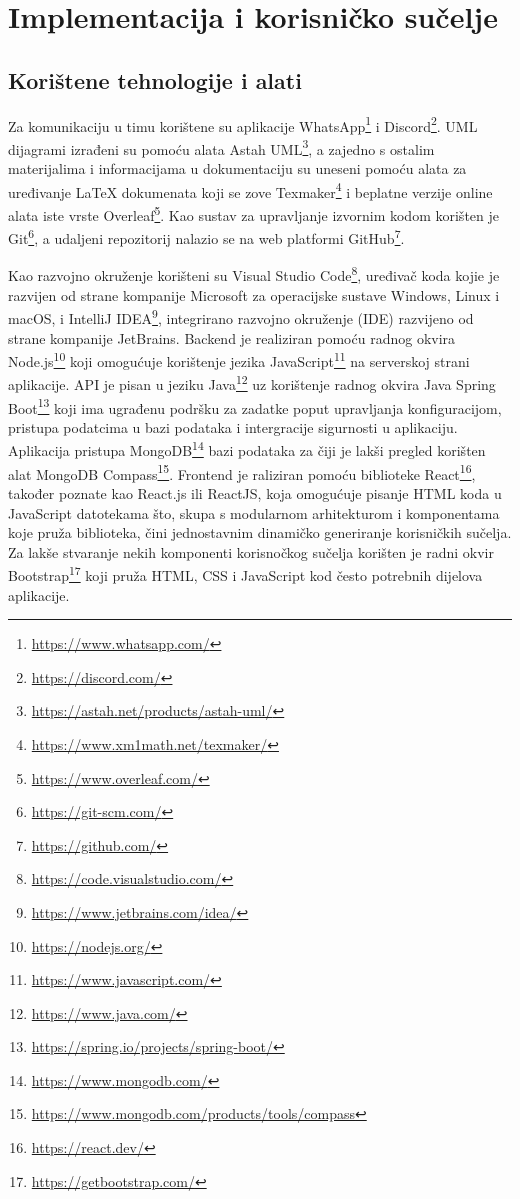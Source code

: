\chapter{Implementacija i korisničko sučelje}
		
		
		\section{Korištene tehnologije i alati}
		
			Za komunikaciju u timu korištene su aplikacije WhatsApp\footnote{\url{https://www.whatsapp.com/}} i Discord\footnote{\url{https://discord.com/}}. UML dijagrami izrađeni su pomoću alata Astah UML\footnote{\url{https://astah.net/products/astah-uml/}}, a zajedno s ostalim materijalima i informacijama u dokumentaciju su uneseni pomoću alata za uređivanje LaTeX dokumenata koji se zove Texmaker\footnote{\url{https://www.xm1math.net/texmaker/}} i beplatne verzije online alata iste vrste Overleaf\footnote{\url{https://www.overleaf.com/}}. Kao sustav za upravljanje izvornim kodom korišten je Git\footnote{\url{https://git-scm.com/}}, a udaljeni repozitorij nalazio se na web platformi GitHub\footnote{\url{https://github.com/}}. 

Kao razvojno okruženje korišteni su Visual Studio Code\footnote{\url{https://code.visualstudio.com/}}, uređivač koda kojie je razvijen od strane kompanije Microsoft za operacijske sustave Windows, Linux i macOS, i IntelliJ IDEA\footnote{\url{https://www.jetbrains.com/idea/}}, integrirano razvojno okruženje (IDE) razvijeno od strane kompanije JetBrains. Backend je realiziran pomoću radnog okvira Node.js\footnote{\url{https://nodejs.org/}} koji omogućuje korištenje jezika JavaScript\footnote{\url{https://www.javascript.com/}} na serverskoj strani aplikacije. API je pisan u jeziku Java\footnote{\url{https://www.java.com/}} uz korištenje radnog okvira Java Spring Boot\footnote{\url{https://spring.io/projects/spring-boot/}} koji ima ugrađenu podršku za zadatke poput upravljanja konfiguracijom, pristupa podatcima u bazi podataka i intergracije sigurnosti u aplikaciju. Aplikacija pristupa MongoDB\footnote{\url{https://www.mongodb.com/}} bazi podataka za čiji je lakši pregled korišten alat MongoDB Compass\footnote{\url{https://www.mongodb.com/products/tools/compass}}. Frontend je raliziran pomoću biblioteke React\footnote{\url{https://react.dev/}}, također poznate kao React.js ili ReactJS, koja omogućuje pisanje HTML koda u JavaScript datotekama što, skupa s modularnom arhitekturom i komponentama koje pruža biblioteka, čini jednostavnim dinamičko generiranje korisničkih sučelja. Za lakše stvaranje nekih komponenti korisnočkog sučelja korišten je radni okvir Bootstrap\footnote{\url{https://getbootstrap.com/}} koji pruža HTML, CSS i JavaScript kod često potrebnih dijelova aplikacije.

